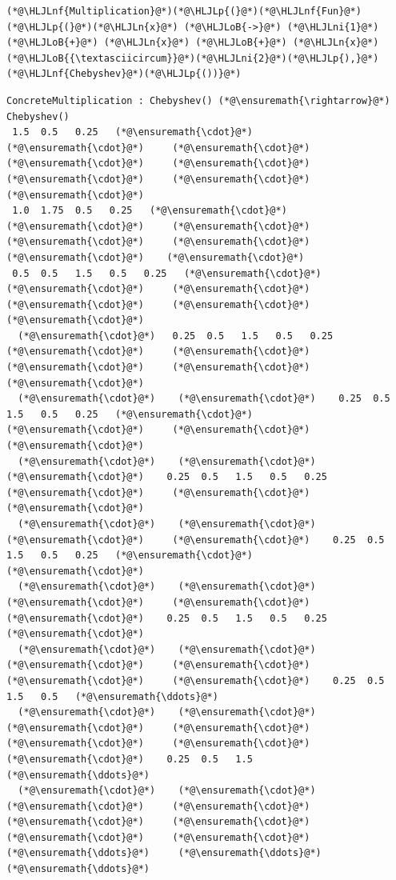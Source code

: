 \documentclass[12pt,a4paper]{article}
\newcommand{\HLJLn}[1]{#1}
\newcommand{\HLJLnf}[1]{\textcolor[RGB]{66,102,213}{#1}}
\newcommand{\HLJLni}[1]{\textcolor[RGB]{59,151,46}{#1}}
\newcommand{\HLJLoB}[1]{\textcolor[RGB]{102,102,102}{\textbf{#1}}}
\newcommand{\HLJLp}[1]{#1}
\begin{document}
\begin{lstlisting}
(*@\HLJLnf{Multiplication}@*)(*@\HLJLp{(}@*)(*@\HLJLnf{Fun}@*)(*@\HLJLp{(}@*)(*@\HLJLn{x}@*) (*@\HLJLoB{->}@*) (*@\HLJLni{1}@*) (*@\HLJLoB{+}@*) (*@\HLJLn{x}@*) (*@\HLJLoB{+}@*) (*@\HLJLn{x}@*)(*@\HLJLoB{{\textasciicircum}}@*)(*@\HLJLni{2}@*)(*@\HLJLp{),}@*)(*@\HLJLnf{Chebyshev}@*)(*@\HLJLp{())}@*)
\end{lstlisting}

\begin{lstlisting}
ConcreteMultiplication : Chebyshev() (*@\ensuremath{\rightarrow}@*) Chebyshev()
 1.5  0.5   0.25   (*@\ensuremath{\cdot}@*)     (*@\ensuremath{\cdot}@*)     (*@\ensuremath{\cdot}@*)     (*@\ensuremath{\cdot}@*)     (*@\ensuremath{\cdot}@*)     (*@\ensuremath{\cdot}@*)     (*@\ensuremath{\cdot}@*)    (*@\ensuremath{\cdot}@*)
 1.0  1.75  0.5   0.25   (*@\ensuremath{\cdot}@*)     (*@\ensuremath{\cdot}@*)     (*@\ensuremath{\cdot}@*)     (*@\ensuremath{\cdot}@*)     (*@\ensuremath{\cdot}@*)     (*@\ensuremath{\cdot}@*)    (*@\ensuremath{\cdot}@*)
 0.5  0.5   1.5   0.5   0.25   (*@\ensuremath{\cdot}@*)     (*@\ensuremath{\cdot}@*)     (*@\ensuremath{\cdot}@*)     (*@\ensuremath{\cdot}@*)     (*@\ensuremath{\cdot}@*)    (*@\ensuremath{\cdot}@*)
  (*@\ensuremath{\cdot}@*)   0.25  0.5   1.5   0.5   0.25   (*@\ensuremath{\cdot}@*)     (*@\ensuremath{\cdot}@*)     (*@\ensuremath{\cdot}@*)     (*@\ensuremath{\cdot}@*)    (*@\ensuremath{\cdot}@*)
  (*@\ensuremath{\cdot}@*)    (*@\ensuremath{\cdot}@*)    0.25  0.5   1.5   0.5   0.25   (*@\ensuremath{\cdot}@*)     (*@\ensuremath{\cdot}@*)     (*@\ensuremath{\cdot}@*)    (*@\ensuremath{\cdot}@*)
  (*@\ensuremath{\cdot}@*)    (*@\ensuremath{\cdot}@*)     (*@\ensuremath{\cdot}@*)    0.25  0.5   1.5   0.5   0.25   (*@\ensuremath{\cdot}@*)     (*@\ensuremath{\cdot}@*)    (*@\ensuremath{\cdot}@*)
  (*@\ensuremath{\cdot}@*)    (*@\ensuremath{\cdot}@*)     (*@\ensuremath{\cdot}@*)     (*@\ensuremath{\cdot}@*)    0.25  0.5   1.5   0.5   0.25   (*@\ensuremath{\cdot}@*)    (*@\ensuremath{\cdot}@*)
  (*@\ensuremath{\cdot}@*)    (*@\ensuremath{\cdot}@*)     (*@\ensuremath{\cdot}@*)     (*@\ensuremath{\cdot}@*)     (*@\ensuremath{\cdot}@*)    0.25  0.5   1.5   0.5   0.25  (*@\ensuremath{\cdot}@*)
  (*@\ensuremath{\cdot}@*)    (*@\ensuremath{\cdot}@*)     (*@\ensuremath{\cdot}@*)     (*@\ensuremath{\cdot}@*)     (*@\ensuremath{\cdot}@*)     (*@\ensuremath{\cdot}@*)    0.25  0.5   1.5   0.5   (*@\ensuremath{\ddots}@*)
  (*@\ensuremath{\cdot}@*)    (*@\ensuremath{\cdot}@*)     (*@\ensuremath{\cdot}@*)     (*@\ensuremath{\cdot}@*)     (*@\ensuremath{\cdot}@*)     (*@\ensuremath{\cdot}@*)     (*@\ensuremath{\cdot}@*)    0.25  0.5   1.5   (*@\ensuremath{\ddots}@*)
  (*@\ensuremath{\cdot}@*)    (*@\ensuremath{\cdot}@*)     (*@\ensuremath{\cdot}@*)     (*@\ensuremath{\cdot}@*)     (*@\ensuremath{\cdot}@*)     (*@\ensuremath{\cdot}@*)     (*@\ensuremath{\cdot}@*)     (*@\ensuremath{\cdot}@*)     (*@\ensuremath{\ddots}@*)     (*@\ensuremath{\ddots}@*)    (*@\ensuremath{\ddots}@*)
\end{lstlisting}
\end{document}
